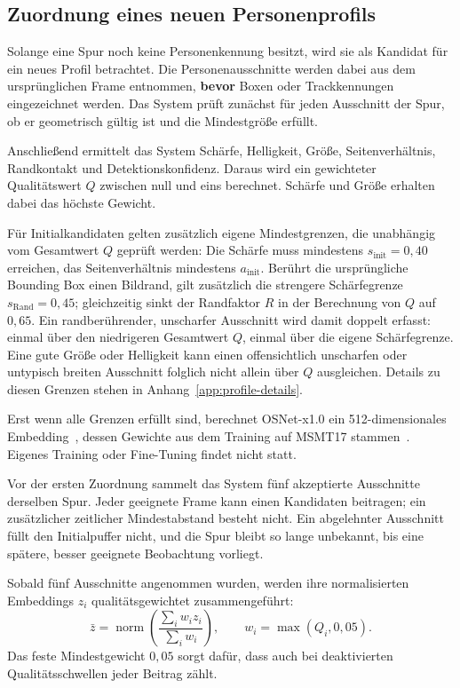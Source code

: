 \subsection{Zuordnung eines neuen Personenprofils}
\label{sec:new-profile}

Solange eine Spur noch keine Personenkennung besitzt, wird sie als Kandidat für ein neues Profil betrachtet. Die Personenausschnitte werden dabei aus dem ursprünglichen Frame entnommen, \textbf{bevor} Boxen oder Trackkennungen eingezeichnet werden. Das System prüft zunächst für jeden Ausschnitt der Spur, ob er geometrisch gültig ist und die Mindestgröße erfüllt.

Anschließend ermittelt das System Schärfe, Helligkeit, Grö{\ss}e, Seitenverhältnis, Randkontakt und Detektionskonfidenz. Daraus wird ein gewichteter Qualitätswert $Q$ zwischen null und eins berechnet. Schärfe und Grö{\ss}e erhalten dabei das höchste Gewicht.

Für Initialkandidaten gelten zusätzlich eigene Mindestgrenzen, die unabhängig vom Gesamtwert $Q$ geprüft werden: Die Schärfe muss mindestens $s_{\mathrm{init}}=0{,}40$ erreichen, das Seitenverhältnis mindestens $a_{\mathrm{init}}$. Berührt die ursprüngliche Bounding Box einen Bildrand, gilt zusätzlich die strengere Schärfegrenze $s_{\mathrm{Rand}}=0{,}45$; gleichzeitig sinkt der Randfaktor $R$ in der Berechnung von $Q$ auf $0{,}65$. Ein randberührender, unscharfer Ausschnitt wird damit doppelt erfasst: einmal über den niedrigeren Gesamtwert $Q$, einmal über die eigene Schärfegrenze. Eine gute Grö{\ss}e oder Helligkeit kann einen offensichtlich unscharfen oder untypisch breiten Ausschnitt folglich nicht allein über $Q$ ausgleichen. Details zu diesen Grenzen stehen in Anhang~\ref{app:profile-details}.

Erst wenn alle Grenzen erfüllt sind, berechnet OSNet-x1.0 ein 512-dimensionales Embedding~\cite{zhou2019osnet}, dessen Gewichte aus dem Training auf MSMT17 stammen~\cite{torchreid-modelzoo}. Eigenes Training oder Fine-Tuning findet nicht statt.

Vor der ersten Zuordnung sammelt das System fünf akzeptierte Ausschnitte derselben Spur. Jeder geeignete Frame kann einen Kandidaten beitragen; ein zusätzlicher zeitlicher Mindestabstand besteht nicht. Ein abgelehnter Ausschnitt füllt den Initialpuffer nicht, und die Spur bleibt so lange unbekannt, bis eine spätere, besser geeignete Beobachtung vorliegt.

Sobald fünf Ausschnitte angenommen wurden, werden ihre normalisierten Embeddings $z_i$ qualitätsgewichtet zusammengeführt:
\begin{equation}
\bar z=\operatorname{norm}\left(\frac{\sum_i w_i z_i}{\sum_i w_i}\right),
\qquad w_i=\max(Q_i,0{,}05).
\label{eq:fusion}
\end{equation}
Das feste Mindestgewicht $0{,}05$ sorgt dafür, dass auch bei deaktivierten Qualitätsschwellen jeder Beitrag zählt.

